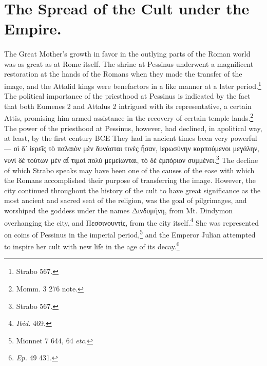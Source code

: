 \documentclass[a4paper, 11pt, oneside, polutonikogreek, french]{article}
\begin{document}
\section{The Spread of the Cult under the Empire.}
\paragraph{}
The Great Mother's growth in favor in the outlying parts of the Roman world was as great as at Rome itself. The shrine at Pessinus underwent a magnificent restoration at the hands of the Romans when they made the transfer of the image, and the Attalid kings were benefactors in a like manner at a later period.\footnote{Strabo 567.} The political importance of the priesthood at Pessinus is indicated by the fact that both Eumenes 2 and Attalus 2 intrigued with its representative, a certain Attis, promising him armed assistance in the recovery of certain temple lands.\footnote{Momm. 3 276 note.} The power of the priesthood at Pessinus, however, had declined, in apolitical way, at least, by the first century \textsc{BCE} They had in ancient times been very powerful --- οὶ δ᾽ ἱερεῖς τὸ παλαιὸν μὲν δυνάσται τινὲς ἦσαν, ἱερωσύνην καρπούμενοι μεγάλην, νυνὶ δὲ τούτων μὲν αἷ τιμαὶ πολὺ μεμείωνται, τὸ δὲ ἐμπόριον συμμένει.\footnote{Strabo 567.} The decline of which Strabo speaks may have been one of the causes of the ease with which the Romans accomplished their purpose of transferring the image. However, the city continued throughout the history of the cult to have great significance as the most ancient and sacred seat of the religion, was the goal of pilgrimages, and worshiped the goddess under the names Δινδυμήνη, from Mt. Dindymon overhanging the city, and Πεσσινουντίς, from the city itself.\footnote{\emph{Ibid.} 469.} She was represented on coins of Pessinus in the imperial period,\footnote{Mionnet 7 644, 64 \emph{etc.}} and the Emperor Julian attempted to inspire her cult with new life in the age of its decay.\footnote{\emph{Ep.} 49 431.}
\end{document}
